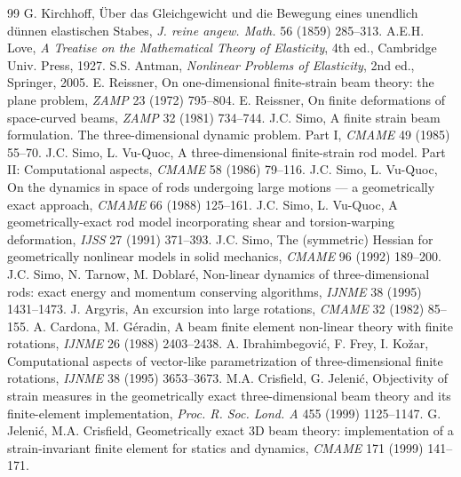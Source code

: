 \documentclass[11pt,a4paper]{article}
\begin{document}
\begin{thebibliography}{99}\small
{} G. Kirchhoff, Über das Gleichgewicht und die Bewegung eines unendlich dünnen elastischen Stabes, \emph{J. reine angew. Math.} 56 (1859) 285--313.
 A.E.H. Love, \emph{A Treatise on the Mathematical Theory of Elasticity}, 4th ed., Cambridge Univ. Press, 1927.
 S.S. Antman, \emph{Nonlinear Problems of Elasticity}, 2nd ed., Springer, 2005.
 E. Reissner, On one-dimensional finite-strain beam theory: the plane problem, \emph{ZAMP} 23 (1972) 795--804.
 E. Reissner, On finite deformations of space-curved beams, \emph{ZAMP} 32 (1981) 734--744.
 J.C. Simo, A finite strain beam formulation. The three-dimensional dynamic problem. Part I, \emph{CMAME} 49 (1985) 55--70.
 J.C. Simo, L. Vu-Quoc, A three-dimensional finite-strain rod model. Part II: Computational aspects, \emph{CMAME} 58 (1986) 79--116.
 J.C. Simo, L. Vu-Quoc, On the dynamics in space of rods undergoing large motions --- a geometrically exact approach, \emph{CMAME} 66 (1988) 125--161.
 J.C. Simo, L. Vu-Quoc, A geometrically-exact rod model incorporating shear and torsion-warping deformation, \emph{IJSS} 27 (1991) 371--393.
 J.C. Simo, The (symmetric) Hessian for geometrically nonlinear models in solid mechanics, \emph{CMAME} 96 (1992) 189--200.
 J.C. Simo, N. Tarnow, M. Doblaré, Non-linear dynamics of three-dimensional rods: exact energy and momentum conserving algorithms, \emph{IJNME} 38 (1995) 1431--1473.
 J. Argyris, An excursion into large rotations, \emph{CMAME} 32 (1982) 85--155.
 A. Cardona, M. Géradin, A beam finite element non-linear theory with finite rotations, \emph{IJNME} 26 (1988) 2403--2438.
 A. Ibrahimbegović, F. Frey, I. Kožar, Computational aspects of vector-like parametrization of three-dimensional finite rotations, \emph{IJNME} 38 (1995) 3653--3673.
 M.A. Crisfield, G. Jelenić, Objectivity of strain measures in the geometrically exact three-dimensional beam theory and its finite-element implementation, \emph{Proc. R. Soc. Lond. A} 455 (1999) 1125--1147.
 G. Jelenić, M.A. Crisfield, Geometrically exact 3D beam theory: implementation of a strain-invariant finite element for statics and dynamics, \emph{CMAME} 171 (1999) 141--171.

\end{thebibliography}
\end{document}
